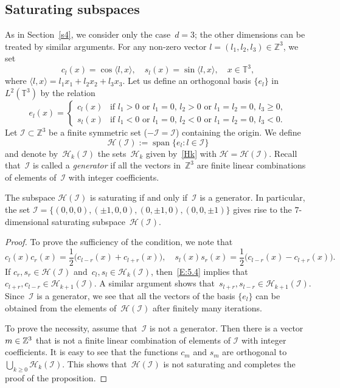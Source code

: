 \documentclass[JEP,XML,SOM,Unicode,ThmDefs]{cedram}
\let\mathcal\mathscr
\theoremstyle{plain}
\numberwithin{equation}{section}
\let\lag\langle
\let\rag\rangle
\newcommand{\Z}{{\mathbb Z}}
\newcommand{\T}{{\mathbb T}}
\DeclareMathOperator{\lspan}{span}
\newcommand{\HH}{{\mathcal H}}
\newcommand{\II}{{\mathcal I}}
\begin{document}
\subsection{Saturating subspaces}
\label{S:5.2}
As in Section~\ref{s4}, we consider only the case~$d=3$; the other dimensions can be treated by similar arguments. For any non-zero vector $l=(l_1,l_2,l_3)\in \Z^3$, we set\vspace*{-3pt}
\[
c_l(x) = \cos\lag l,x\rag, \quad
s_l(x) = \sin\lag l,x\rag, \quad x\in\T^3,
\]
where $\lag l,x\rag = l_1x_1+l_2x_2+l_3x_3$. Let us define an orthogonal basis $\{e_l\}$ in~$L^2(\T^3)$ by the relation\vspace*{-3pt}
\[
e_l(x)=
\begin{cases} c_l(x) & \text{if }l_1 > 0\text{ or } l_1=0,\, l_2 > 0 \text{ or } l_1=l_2=0,\, l_3 \ge 0, \\ s_l(x) & \text{if }l_1 < 0\text{ or } l_1=0,\, l_2 < 0\text{ or } l_1=l_2=0,\, l_3 < 0.
\end{cases}
\]
Let $\II\subset\Z^3$ be a finite symmetric set (\ie $-\II=\II$) containing the origin. We define\vspace*{-3pt}%
\begin{equation}\label{E:5.3}
\HH(\II):=\lspan\{e_l:l\in\II\}
\end{equation}
and denote by~$\HH_k(\II)$ the sets~$\HH_k$ given by~\eqref{Hk} with $\HH=\HH(\II)$. Recall that~$\II$ is called a \emph{generator} if all the vectors in~$\Z^3$ are finite linear combinations of elements of~$\II$ with integer coefficients.

\begin{proposition}\label{P:5.2}
The subspace $\HH(\II)$ is saturating if and only if~$\II$ is a generator. In particular, the set $\II=\{(0,0,0), (\pm1,0,0),(0,\pm1,0),(0,0,\pm1)\}$ gives rise to the $7$-dimensional saturating subspace~$\HH(\II)$.
\end{proposition}

\begin{proof}
To prove the sufficiency of the condition, we note that\vspace*{-3pt}
\begin{equation}\label{E:5.4}
c_l(x)c_r(x)=\frac12\bigl(c_{l-r}(x)+c_{l+r}(x)\bigr), \quad
s_l(x)s_r(x)=\frac12\bigl(c_{l-r}(x)-c_{l+r}(x)\bigr).
\end{equation}
If $c_r, s_r\in\HH(\II)$ and~$c_l, s_l\in \HH_k(\II)$, then~\eqref{E:5.4} implies that $c_{l+r}, c_{l-r}\in \HH_{k+1}(\II)$. A similar argument shows that~$s_{l+r},s_{l-r}\in \HH_{k+1}(\II)$. Since~$\II$ is a generator, we see that all the vectors of the basis $\{e_l\}$ can be obtained from the elements of~$\HH(\II)$ after finitely many iterations.

To prove the necessity, assume that~$\II$ is not a generator. Then there is a vector $m\in\nobreak \Z^3$ that is not a finite linear combination of elements of $\II$ with integer coefficients. It is easy to see that the functions $c_m$ and $s_m$ are orthogonal to $\bigcup_{k\ge0} \HH_k(\II)$. This shows that~$\HH(\II)$ is not saturating and completes the proof of the proposition.
\end{proof}
\end{document}
